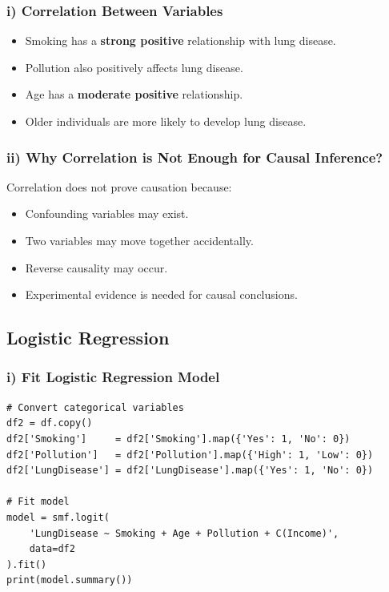 \documentclass[12pt,a4paper]{article}
\begin{document}
\subsubsection{i) Correlation Between Variables}
\begin{interpbox}
\begin{itemize}[noitemsep]
  \item Smoking has a \textbf{strong positive} relationship with lung disease.
  \item Pollution also positively affects lung disease.
  \item Age has a \textbf{moderate positive} relationship.
  \item Older individuals are more likely to develop lung disease.
\end{itemize}
\end{interpbox}

\subsubsection{ii) Why Correlation is Not Enough for Causal Inference?}
\begin{interpbox}
Correlation does not prove causation because:
\begin{itemize}[noitemsep]
  \item Confounding variables may exist.
  \item Two variables may move together accidentally.
  \item Reverse causality may occur.
  \item Experimental evidence is needed for causal conclusions.
\end{itemize}
\end{interpbox}

\subsection{Logistic Regression}

\subsubsection{i) Fit Logistic Regression Model}

\begin{lstlisting}
# Convert categorical variables
df2 = df.copy()
df2['Smoking']     = df2['Smoking'].map({'Yes': 1, 'No': 0})
df2['Pollution']   = df2['Pollution'].map({'High': 1, 'Low': 0})
df2['LungDisease'] = df2['LungDisease'].map({'Yes': 1, 'No': 0})

# Fit model
model = smf.logit(
    'LungDisease ~ Smoking + Age + Pollution + C(Income)',
    data=df2
).fit()
print(model.summary())
\end{lstlisting}
\end{document}
